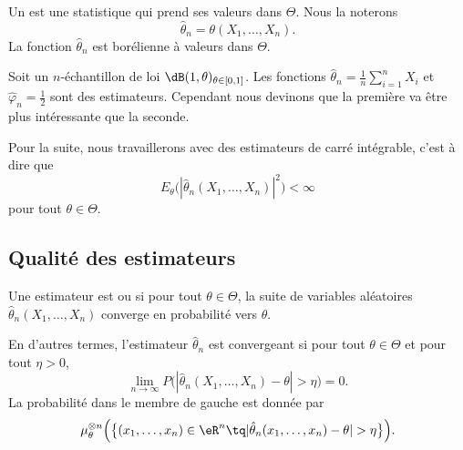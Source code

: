 Un  est une statistique qui prend ses valeurs dans \( \Theta\). Nous la noterons
\begin{equation}
    \hat\theta_n=\theta(X_1,\ldots,X_n).
\end{equation}
La fonction \( \hat\theta_n\) est borélienne à valeurs dans \( \Theta\).

\begin{example}
    Soit un \( n\)-échantillon de loi \( \dB(1,\theta)_{\theta\in\mathopen[ 0 , 1 \mathclose]}\). Les fonctions \( \hat\theta_n=\frac{1}{ n }\sum_{i=1}^nX_i\) et \( \hat\varphi_n=\frac{ 1 }{2}\) sont des estimateurs. Cependant nous devinons que la première va être plus intéressante que la seconde.
\end{example}

Pour la suite, nous travaillerons avec des estimateurs de carré intégrable, c'est à dire que
\begin{equation}
    E_{\theta}\big( | \hat\theta_n(X_1,\ldots,X_n) |^2 \big)<\infty
\end{equation}
pour tout \( \theta\in\Theta\).

\subsection{Qualité des estimateurs}

\begin{definition}
    Une estimateur est  ou  si pour tout \( \theta\in\Theta\), la suite de variables aléatoires \( \hat\theta_n(X_1,\ldots,X_n)\) converge en probabilité vers \( \theta\).
\end{definition}
En d'autres termes, l'estimateur \( \hat\theta_n\) est convergeant si pour tout \( \theta\in\Theta\) et pour tout \( \eta>0\),
\begin{equation}
    \lim_{n\to \infty} P\big( | \hat\theta_n(X_1,\ldots,X_n)-\theta |>\eta \big)=0.
\end{equation}
La probabilité dans le membre de gauche est donnée par
\begin{equation}
    \mu^{\otimes n}_{\theta}\Big( \big\{ (x_1,\ldots,x_n)\in\eR^n\tq| \hat\theta_n(x_1,\ldots,x_n)-\theta |>\eta \big\} \Big).
\end{equation}


